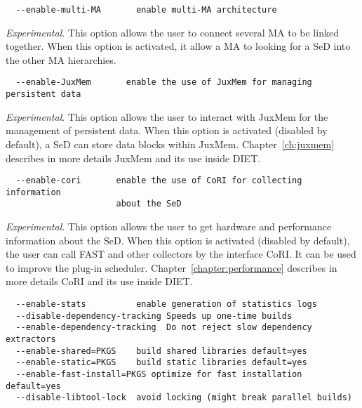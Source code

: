 \label{sec:multimainstall}
{\footnotesize
\begin{verbatim}
  --enable-multi-MA       enable multi-MA architecture
\end{verbatim}
}
\noindent \textit{Experimental}.  This option allows the user to
connect several MA to be linked together. When this option is
activated, it allow a MA to looking for a SeD into the other MA
hierarchies.

{\footnotesize
\begin{verbatim}
  --enable-JuxMem       enable the use of JuxMem for managing persistent data
\end{verbatim}
}
\noindent \textit{Experimental}.  This option allows the user to
interact with JuxMem for the management of persistent data. When
this option is activated (disabled by default), a SeD can store data
blocks within JuxMem. Chapter~\ref{ch:juxmem} describes in more
details JuxMem and its use inside DIET.

{\footnotesize
\begin{verbatim}
  --enable-cori       enable the use of CoRI for collecting information 
                      about the SeD
\end{verbatim}
}
\noindent \textit{Experimental}.  This option allows the user to
get hardware and performance information about the SeD. When
this option is activated (disabled by default), the user can call FAST and other 
collectors by the interface CoRI. It can be used to improve the plug-in scheduler.
Chapter~\ref{chapter:performance} describes in more details CoRI and its use inside DIET.

{\footnotesize
\begin{verbatim}
  --enable-stats          enable generation of statistics logs
  --disable-dependency-tracking Speeds up one-time builds
  --enable-dependency-tracking  Do not reject slow dependency extractors
  --enable-shared=PKGS    build shared libraries default=yes
  --enable-static=PKGS    build static libraries default=yes
  --enable-fast-install=PKGS optimize for fast installation default=yes
  --disable-libtool-lock  avoid locking (might break parallel builds)
\end{verbatim}
}


